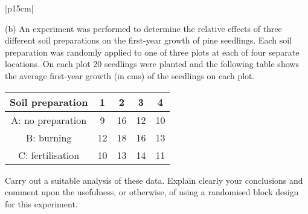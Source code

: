 \documentclass[a4paper,12pt]{article}
\begin{document}
\begin{table}[ht!]
 
\centering
 
\begin{tabular}{|p{15cm}|}
 
\hline  

(b) An experiment was performed to determine the relative effects of three different soil preparations on the first-year growth of pine seedlings.  Each soil preparation was randomly applied to one of three plots at each of four separate locations.  On each plot 20 seedlings were planted and the following table shows the average first-year growth (in cms) of the seedlings on each plot.

\begin{center}
\begin{tabular}{|c|c|c|c|c|}\hline
Soil preparation  &      1 &         2  &       3&  4 \\ \hline \hline
A: no preparation  &      9     &    16   &    12 &  10 \\ \hline
B: burning  &    12     &   18    &  16 & 13 \\ \hline
C: fertilisation  &    10    &    13  &    14 & 11  \\ \hline
\end{tabular}
\end{center}

Carry out a suitable analysis of these data.  Explain clearly your conclusions and comment upon the usefulness, or otherwise, of using a randomised block design for this experiment.

\\ \hline
  
\end{tabular}

\end{table}
\end{document}
